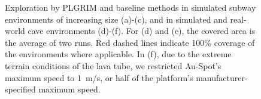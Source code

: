\documentclass[letterpaper]{article} %
\begin{document}
\begin{figure}[t!]
		\caption{Exploration by PLGRIM and baseline methods in simulated subway environments of increasing size (a)-(c), and in simulated and real-world cave environments (d)-(f). For (d) and (e), the covered area is the average of two runs. Red dashed lines indicate 100\% coverage of the environments where applicable. In (f), due to the extreme terrain conditions of the lava tube, we restricted Au-Spot's maximum speed to 1~m/s, or half of the platform's manufacturer-specified maximum speed.  
		}
    \label{fig:all_together_plot}
\end{figure}



\end{document}
